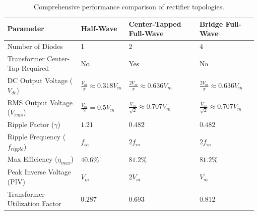 \begin{table}[htbp]
\centering
\small
\begin{tabularx}{\textwidth}{lXXX}
\toprule
\textbf{Parameter} & \textbf{Half-Wave} & \textbf{Center-Tapped Full-Wave} & \textbf{Bridge Full-Wave} \\
\midrule
Number of Diodes & 1 & 2 & 4 \\
Transformer Center-Tap Required & No & Yes & No \\
DC Output Voltage ($V_{dc}$) & $\frac{V_m}{\pi} \approx 0.318 V_m$ & $\frac{2V_m}{\pi} \approx 0.636 V_m$ & $\frac{2V_m}{\pi} \approx 0.636 V_m$ \\
RMS Output Voltage ($V_{rms}$) & $\frac{V_m}{2} = 0.5 V_m$ & $\frac{V_m}{\sqrt{2}} \approx 0.707 V_m$ & $\frac{V_m}{\sqrt{2}} \approx 0.707 V_m$ \\
Ripple Factor ($\gamma$) & $1.21$ & $0.482$ & $0.482$ \\
Ripple Frequency ($f_{ripple}$) & $f_{in}$ & $2f_{in}$ & $2f_{in}$ \\
Max Efficiency ($\eta_{max}$) & $40.6\%$ & $81.2\%$ & $81.2\%$ \\
Peak Inverse Voltage (PIV) & $V_m$ & $2V_m$ & $V_m$ \\
Transformer Utilization Factor & $0.287$ & $0.693$ & $0.812$ \\
\bottomrule
\end{tabularx}
\caption{Comprehensive performance comparison of rectifier topologies.}
\label{tab:rectifier-comparison}
\end{table}

